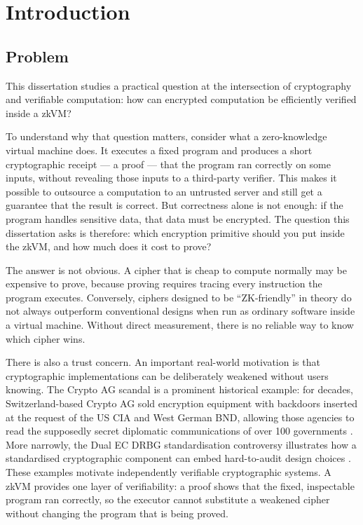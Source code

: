 \chapter{Introduction}

\section{Problem}

This dissertation studies a practical question at the intersection of
cryptography and verifiable computation: how can encrypted computation be
efficiently verified inside a zkVM?

To understand why that question matters, consider what a zero-knowledge virtual
machine does. It executes a fixed program and produces a short cryptographic
receipt --- a proof --- that the program ran correctly on some inputs, without
revealing those inputs to a third-party verifier. This makes it possible to
outsource a computation to an untrusted server and still get a guarantee that the
result is correct. But correctness alone is not enough: if the program handles
sensitive data, that data must be encrypted. The question this dissertation asks
is therefore: which encryption primitive should you put inside the zkVM, and how
much does it cost to prove?

The answer is not obvious. A cipher that is cheap to compute normally may be
expensive to prove, because proving requires tracing every instruction the
program executes. Conversely, ciphers designed to be ``ZK-friendly'' in theory
do not always outperform conventional designs when run as ordinary software
inside a virtual machine. Without direct measurement, there is no reliable way
to know which cipher wins.

There is also a trust concern. An important real-world motivation is that
cryptographic implementations can be deliberately weakened without users
knowing. The Crypto AG scandal is a prominent historical example: for decades,
Switzerland-based Crypto AG sold encryption equipment with backdoors inserted
at the request of the US CIA and West German BND, allowing those agencies to
read the supposedly secret diplomatic communications of over 100 governments
\cite{cryptoag2020,zetter2020}. More narrowly, the Dual EC DRBG standardisation
controversy illustrates how a standardised cryptographic component can embed
hard-to-audit design choices \cite{bernstein2015dualec}. These examples motivate
independently verifiable cryptographic systems. A zkVM provides one layer of
verifiability: a proof shows that the fixed, inspectable program ran correctly,
so the executor cannot substitute a weakened cipher without changing the program
that is being proved.

